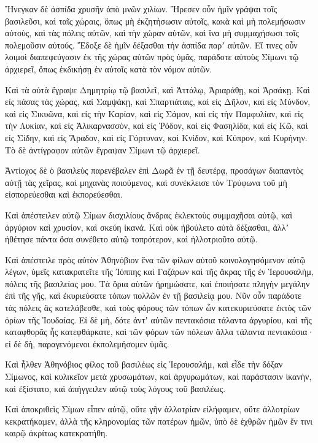 {Ἤνεγκαν δὲ ἀσπίδα χρυσῆν ἀπὸ μνῶν χιλίων.
Ἤρεσεν οὖν ἡμῖν γράψαι τοῖς βασιλεῦσι, καὶ ταῖς χώραις, ὅπως μὴ ἐκζητήσωσιν αὐτοῖς, κακὰ καὶ μὴ πολεμήσωσιν αὐτοὺς, καὶ τὰς πόλεις αὐτῶν, καὶ τὴν χώραν αὐτῶν, καὶ ἵνα μὴ συμμαχήσωσι τοῖς πολεμοῦσιν αὐτούς.
Ἔδοξε δὲ ἡμῖν δέξασθαι τὴν ἀσπίδα παρʼ αὐτῶν.
Εἴ τινες οὖν λοιμοὶ διαπεφεύγασιν ἐκ τῆς χώρας αὐτῶν πρὸς ὑμᾶς, παράδοτε αὐτοὺς Σίμωνι τῷ ἀρχιερεῖ, ὅπως ἐκδικήσῃ ἐν αὐτοῖς κατὰ τὸν νόμον αὐτῶν.
\par }{\PP {}Καὶ τὰ αὐτὰ ἔγραψε Δημητρίῳ τῷ βασιλεῖ, καὶ Ἀττάλῳ, Ἀριαράθῃ, καὶ Ἀρσάκῃ.
Καὶ εἰς πάσας τὰς χώρας, καὶ Σαμψάκῃ, καὶ Σπαρτιάταις, καὶ εἰς Δῆλον, καὶ εἰς Μύνδον, καὶ εἰς Σικυῶνα, καὶ εἰς τὴν Καρίαν, καὶ εἰς Σάμον, καὶ εἰς τὴν Παμφυλίαν, καὶ εἰς τὴν Λυκίαν, καὶ εἰς Ἀλικαρνασσὸν, καὶ εἰς Ῥόδον, καὶ εἰς Φασηλίδα, καὶ εἰς Κῶ, καὶ εἰς Σίδην, καὶ εἰς Ἄραδον, καὶ εἰς Γόρτυναν, καὶ Κνίδον, καὶ Κύπρον, καὶ Κυρήνην.
Τὸ δὲ ἀντίγραφον αὐτῶν ἔγραψαν Σίμωνι τῷ ἀρχιερεῖ.
\par }{\PP {}Ἀντίοχος δὲ ὁ βασιλεὺς παρενέβαλεν ἐπὶ Δωρᾶ ἐν τῇ δευτέρᾳ, προσάγων διαπαντὸς αὐτῇ τὰς χεῖρας, καὶ μηχανὰς ποιούμενος, καὶ συνέκλεισε τὸν Τρύφωνα τοῦ μὴ εἰσπορεύεσθαι καὶ ἐκπορεύεσθαι.
\par }{\PP {}Καὶ ἀπέστειλεν αὐτῷ Σίμων δισχιλίους ἄνδρας ἐκλεκτοὺς συμμαχῆσαι αὐτῷ, καὶ ἀργύριον καὶ χρυσίον, καὶ σκεύη ἱκανά.
Καὶ οὐκ ἠβούλετο αὐτὰ δέξασθαι, ἀλλʼ ἠθέτησε πάντα ὅσα συνέθετο αὐτῷ τοπρότερον, καὶ ἠλλοτριοῦτο αὐτῷ.
\par }{\PP {}Καὶ ἀπέστειλε πρὸς αὐτὸν Ἀθηνόβιον ἕνα τῶν φίλων αὐτοῦ κοινολογησόμενον αὐτῷ λέγων, ὑμεῖς κατακρατεῖτε τῆς Ἰόππης καὶ Γαζάρων καὶ τῆς ἄκρας τῆς ἐν Ἱερουσαλὴμ, πόλεις τῆς βασιλείας μου.
Τὰ ὅρια αὐτῶν ἠρημώσατε, καὶ ἐποιήσατε πληγὴν μεγάλην ἐπὶ τῆς γῆς, καὶ ἐκυριεύσατε τόπων πολλῶν ἐν τῇ βασιλείᾳ μου.
Νῦν οὖν παράδοτε τὰς πόλεις ἃς κατελάβεσθε, καὶ τοὺς φόρους τῶν τόπων ὧν κατεκυριεύσατε ἐκτὸς τῶν ὁρίων τῆς Ἰουδαίας.
Εἰ δὲ μὴ, δότε ἀντʼ αὐτῶν πεντακόσια τάλαντα ἀργυρίου, καὶ τῆς καταφθορᾶς ἧς κατεφθάρκατε, καὶ τῶν φόρων τῶν πόλεων ἄλλα τάλαντα πεντακόσια· εἰ δὲ δὴ, παραγενόμενοι ἐκπολεμήσομεν ὑμᾶς.
\par }{\PP {}Καὶ ἦλθεν Ἀθηνόβιος φίλος τοῦ βασιλέως εἰς Ἱερουσαλήμ, καὶ εἶδε τὴν δόξαν Σίμωνος, καὶ κυλικεῖον μετὰ χρυσωμάτων, καὶ ἀργυρωμάτων, καὶ παράστασιν ἱκανὴν, καὶ ἐξίστατο, καὶ ἀπήγγειλεν αὐτῷ τοὺς λόγους τοῦ βασιλέως.
\par }{\PP {}Καὶ ἀποκριθεὶς Σίμων εἶπεν αὐτῷ, οὔτε γῆν ἀλλοτρίαν εἰλήφαμεν, οὔτε ἀλλοτρίων κεκρατήκαμεν, ἀλλὰ τῆς κληρονομίας τῶν πατέρων ἡμῶν, ὑπὸ δὲ ἐχθρῶν ἡμῶν ἔν τινι καιρῷ ἀκρίτως κατεκρατήθη.
}
